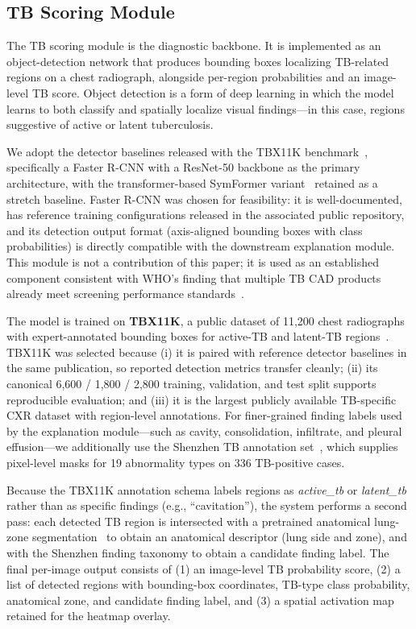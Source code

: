 \documentclass[conference, letterpaper]{IEEEtran}
\begin{document}

\subsection{TB Scoring Module}

The TB scoring module is the diagnostic backbone. It is implemented as an object-detection network that produces bounding boxes localizing TB-related regions on a chest radiograph, alongside per-region probabilities and an image-level TB score. Object detection is a form of deep learning in which the model learns to both classify and spatially localize visual findings---in this case, regions suggestive of active or latent tuberculosis.

We adopt the detector baselines released with the TBX11K benchmark~\cite{liu2020tbx11k, liu2023tbx11k_pami}, specifically a Faster R-CNN with a ResNet-50 backbone as the primary architecture, with the transformer-based SymFormer variant~\cite{liu2023tbx11k_pami} retained as a stretch baseline. Faster R-CNN was chosen for feasibility: it is well-documented, has reference training configurations released in the associated public repository, and its detection output format (axis-aligned bounding boxes with class probabilities) is directly compatible with the downstream explanation module. This module is not a contribution of this paper; it is used as an established component consistent with WHO's finding that multiple TB CAD products already meet screening performance standards~\cite{who_cad_approval_2025}.

The model is trained on \textbf{TBX11K}, a public dataset of 11,200 chest radiographs with expert-annotated bounding boxes for active-TB and latent-TB regions~\cite{liu2020tbx11k}. TBX11K was selected because (i) it is paired with reference detector baselines in the same publication, so reported detection metrics transfer cleanly; (ii) its canonical 6,600 / 1,800 / 2,800 training, validation, and test split supports reproducible evaluation; and (iii) it is the largest publicly available TB-specific CXR dataset with region-level annotations. For finer-grained finding labels used by the explanation module---such as cavity, consolidation, infiltrate, and pleural effusion---we additionally use the Shenzhen TB annotation set~\cite{yang2022shenzhen_annotations}, which supplies pixel-level masks for 19 abnormality types on 336 TB-positive cases.

Because the TBX11K annotation schema labels regions as \textit{active\_tb} or \textit{latent\_tb} rather than as specific findings (e.g., ``cavitation''), the system performs a second pass: each detected TB region is intersected with a pretrained anatomical lung-zone segmentation~\cite{cohen2022torchxrayvision} to obtain an anatomical descriptor (lung side and zone), and with the Shenzhen finding taxonomy to obtain a candidate finding label. The final per-image output consists of (1) an image-level TB probability score, (2) a list of detected regions with bounding-box coordinates, TB-type class probability, anatomical zone, and candidate finding label, and (3) a spatial activation map retained for the heatmap overlay.
\end{document}
